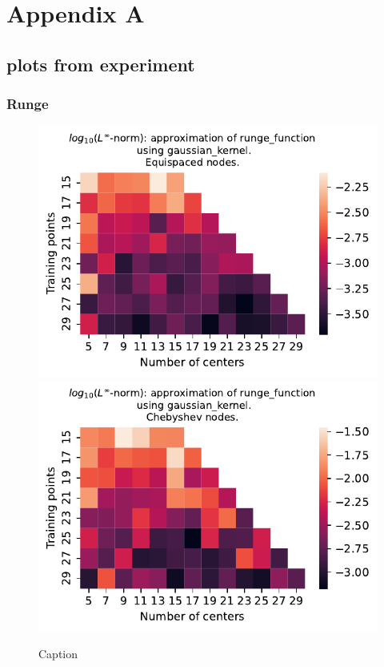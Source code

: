 \documentclass[12pt]{report} %
\begin{document}
\chapter*{Appendix A}\label{appendix-1d}

\section*{plots from experiment}

\subsection*{Runge}

\begin{figure}[ht]
  \centering

  \includegraphics[width=.49\textwidth]{imagenes/experiments/1d/variational/runge_function-Kgaussian_kernel-Equi.pdf}
  \includegraphics[width=.49\textwidth]{imagenes/experiments/1d/variational/runge_function-Kgaussian_kernel-Cheb.pdf}
  \caption{Caption}
  \label{fig:runge-gaussian}
\end{figure}
\end{document}

